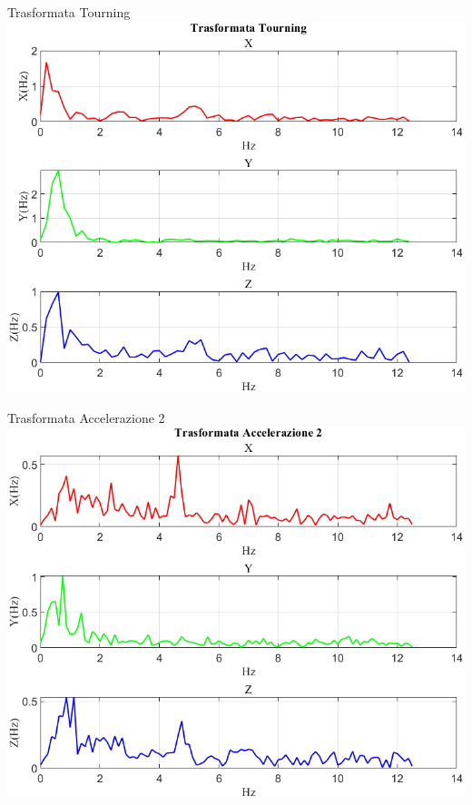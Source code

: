 \documentclass[beamer]{standalone}
\begin{document}
	\begin{frame}{{Trasformata Tourning}}
		\centering\includegraphics[height=.8\textheight]{figure/Mag/Trasformata/Trasformata Tourning}
	\end{frame}
	
	\begin{frame}{{Trasformata Accelerazione 2}}
		\centering\includegraphics[height=.8\textheight]{figure/Mag/Trasformata/Trasformata Accelerazione 2}
	\end{frame}
	
\end{document}
